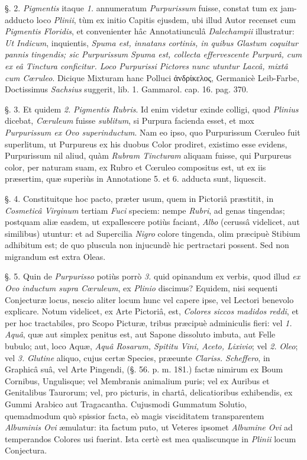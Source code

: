 \documentclass[a4paper, 11pt, oneside, polutonikogreek, german]{article}
\begin{document}
§. 2. \emph{Pigmentis} itaque \emph{1.} annumeratum \emph{Purpurissum} fuisse, constat tum ex jam-adducto loco \emph{Plinii}, tùm ex initio Capitis ejusdem, ubi illud Autor recenset cum \emph{Pigmentis Floridis}, et convenienter hâc Annotatiunculâ \emph{Dalechampii} illustratur: \emph{Ut Indicum}, inquientis, \emph{Spuma est, innatans cortinis, in quibus Glastum coquitur pannis tingendis; sic Purpurissum Spuma est, collecta effervescente Purpurâ, cum ex eâ Tinctura conficitur. Loco Purpurissi Pictores nunc utuntur Laccâ, mixtâ cum Cœruleo}. Dicique Mixturam hanc Polluci ἀνδρίκελος, Germanicè Leib-Farbe, Doctissimus \emph{Sachsius} suggerit, lib. 1. Gammarol. cap. 16. pag. 370.

§. 3. Et quidem \emph{2.} \emph{Pigmentis Rubris}. Id enim videtur exinde colligi, quod \emph{Plinius} dicebat, \emph{Cœruleum} fuisse \emph{sublitum}, si Purpura facienda esset, et mox \emph{Purpurissum ex Ovo superinductum}. Nam eo ipso, quo Purpurissum Cœruleo fuit superlitum, ut Purpureus ex his duobus Color prodiret, existimo esse evidens, Purpurissum nil aliud, quàm \emph{Rubram Tincturam} aliquam fuisse, qui Purpureus color, per naturam suam, ex Rubro et Cœruleo compositus est, ut ex iis præsertim, quæ superiùs in Annotatione 5. et 6. adducta sunt, liquescit.

§. 4. Constituitque hoc pacto, præter usum, quem in Pictoriâ præstitit, in \emph{Cosmeticâ Virginum} tertiam \emph{Fuci} speciem: nempe \emph{Rubri}, ad genas tingendas; postquam aliæ easdem, ut expallescere potiùs faciant, \emph{Albo} (cerussâ videlicet, aut similibus) utuntur: et ad Supercilia \emph{Nigro} colore tingenda, olim præcipuè Stibium adhibitum est; de quo pluscula non injucundè hic pertractari possent. Sed non migrandum est extra Oleas.

§. 5. Quin de \emph{Purpurisso} potiùs porrò \emph{3.} quid opinandum ex verbis, quod illud \emph{ex Ovo inductum supra Cœruleum}, ex \emph{Plinio} discimus? Equidem, nisi sequenti Conjecturæ locus, nescio aliter locum hunc vel capere ipse, vel Lectori benevolo explicare. Notum videlicet, ex Arte Pictoriâ, est, \emph{Colores siccos madidos reddi}, et per hoc tractabiles, pro Scopo Picturæ, tribus præcipuè adminiculis fieri: vel \emph{1.} \emph{Aquâ}, quæ aut simplex penitus est, aut Sapone dissoluto imbuta, aut Felle bubulo; aut, loco Aquæ, \emph{Aquâ Rosarum, Spititu Vini, Aceto, Lixivio}; vel \emph{2.} \emph{Oleo}; vel \emph{3.} \emph{Glutine} aliquo, cujus certæ Species, præeunte \emph{Clariss. Scheffero}, in Graphicâ suâ, vel Arte Pingendi, (§. 56. p. m. 181.) factæ nimirum ex Boum Cornibus, Ungulisque; vel Membranis animalium puris; vel ex Auribus et Genitalibus Taurorum; vel, pro picturis, in chartâ, delicatioribus exhibendis, ex Gummi Arabico aut Tragacantha. Cujusmodi Gummatum Solutio, quemadmodum quò spissior facta, eò magis visciditatem transparentem \emph{Albuminis Ovi} æmulatur: ita factum puto, ut Veteres ipsomet \emph{Albumine Ovi} ad temperandos Colores usi fuerint. Ista certè est mea qualiscunque in \emph{Plinii} locum Conjectura.
\end{document}
